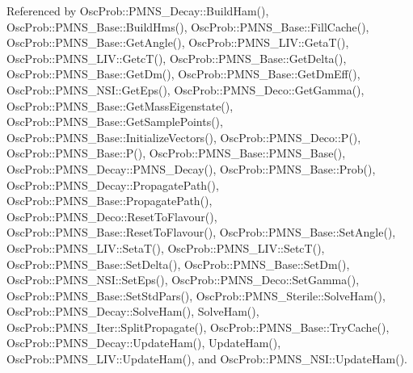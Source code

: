 Referenced by Osc\+Prob\+::\+P\+M\+N\+S\+\_\+\+Decay\+::\+Build\+Ham(), Osc\+Prob\+::\+P\+M\+N\+S\+\_\+\+Base\+::\+Build\+Hms(), Osc\+Prob\+::\+P\+M\+N\+S\+\_\+\+Base\+::\+Fill\+Cache(), Osc\+Prob\+::\+P\+M\+N\+S\+\_\+\+Base\+::\+Get\+Angle(), Osc\+Prob\+::\+P\+M\+N\+S\+\_\+\+L\+I\+V\+::\+Geta\+T(), Osc\+Prob\+::\+P\+M\+N\+S\+\_\+\+L\+I\+V\+::\+Getc\+T(), Osc\+Prob\+::\+P\+M\+N\+S\+\_\+\+Base\+::\+Get\+Delta(), Osc\+Prob\+::\+P\+M\+N\+S\+\_\+\+Base\+::\+Get\+Dm(), Osc\+Prob\+::\+P\+M\+N\+S\+\_\+\+Base\+::\+Get\+Dm\+Eff(), Osc\+Prob\+::\+P\+M\+N\+S\+\_\+\+N\+S\+I\+::\+Get\+Eps(), Osc\+Prob\+::\+P\+M\+N\+S\+\_\+\+Deco\+::\+Get\+Gamma(), Osc\+Prob\+::\+P\+M\+N\+S\+\_\+\+Base\+::\+Get\+Mass\+Eigenstate(), Osc\+Prob\+::\+P\+M\+N\+S\+\_\+\+Base\+::\+Get\+Sample\+Points(), Osc\+Prob\+::\+P\+M\+N\+S\+\_\+\+Base\+::\+Initialize\+Vectors(), Osc\+Prob\+::\+P\+M\+N\+S\+\_\+\+Deco\+::\+P(), Osc\+Prob\+::\+P\+M\+N\+S\+\_\+\+Base\+::\+P(), Osc\+Prob\+::\+P\+M\+N\+S\+\_\+\+Base\+::\+P\+M\+N\+S\+\_\+\+Base(), Osc\+Prob\+::\+P\+M\+N\+S\+\_\+\+Decay\+::\+P\+M\+N\+S\+\_\+\+Decay(), Osc\+Prob\+::\+P\+M\+N\+S\+\_\+\+Base\+::\+Prob(), Osc\+Prob\+::\+P\+M\+N\+S\+\_\+\+Decay\+::\+Propagate\+Path(), Osc\+Prob\+::\+P\+M\+N\+S\+\_\+\+Base\+::\+Propagate\+Path(), Osc\+Prob\+::\+P\+M\+N\+S\+\_\+\+Deco\+::\+Reset\+To\+Flavour(), Osc\+Prob\+::\+P\+M\+N\+S\+\_\+\+Base\+::\+Reset\+To\+Flavour(), Osc\+Prob\+::\+P\+M\+N\+S\+\_\+\+Base\+::\+Set\+Angle(), Osc\+Prob\+::\+P\+M\+N\+S\+\_\+\+L\+I\+V\+::\+Seta\+T(), Osc\+Prob\+::\+P\+M\+N\+S\+\_\+\+L\+I\+V\+::\+Setc\+T(), Osc\+Prob\+::\+P\+M\+N\+S\+\_\+\+Base\+::\+Set\+Delta(), Osc\+Prob\+::\+P\+M\+N\+S\+\_\+\+Base\+::\+Set\+Dm(), Osc\+Prob\+::\+P\+M\+N\+S\+\_\+\+N\+S\+I\+::\+Set\+Eps(), Osc\+Prob\+::\+P\+M\+N\+S\+\_\+\+Deco\+::\+Set\+Gamma(), Osc\+Prob\+::\+P\+M\+N\+S\+\_\+\+Base\+::\+Set\+Std\+Pars(), Osc\+Prob\+::\+P\+M\+N\+S\+\_\+\+Sterile\+::\+Solve\+Ham(), Osc\+Prob\+::\+P\+M\+N\+S\+\_\+\+Decay\+::\+Solve\+Ham(), Solve\+Ham(), Osc\+Prob\+::\+P\+M\+N\+S\+\_\+\+Iter\+::\+Split\+Propagate(), Osc\+Prob\+::\+P\+M\+N\+S\+\_\+\+Base\+::\+Try\+Cache(), Osc\+Prob\+::\+P\+M\+N\+S\+\_\+\+Decay\+::\+Update\+Ham(), Update\+Ham(), Osc\+Prob\+::\+P\+M\+N\+S\+\_\+\+L\+I\+V\+::\+Update\+Ham(), and Osc\+Prob\+::\+P\+M\+N\+S\+\_\+\+N\+S\+I\+::\+Update\+Ham().

\mbox{\label{classOscProb_1_1PMNS__Base_a69db9d57e12fc7cbe0431bc6c18fac93}} 
